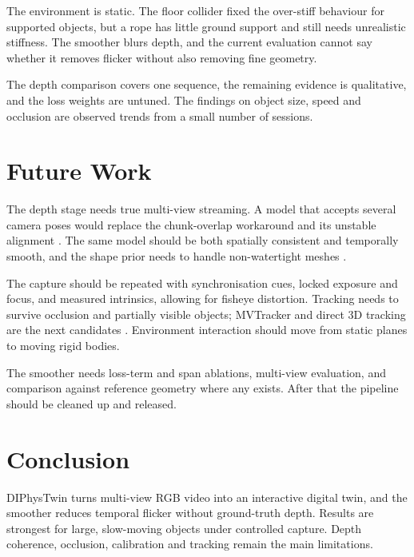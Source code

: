 The environment is static. The floor collider fixed the over-stiff behaviour for supported
objects, but a rope has little ground support and still needs unrealistic stiffness. The smoother
blurs depth, and the current evaluation cannot say whether it removes flicker without also removing
fine geometry. \label{sec:disc-environment}\label{sec:disc-smoothing}

The depth comparison covers one sequence, the remaining evidence is qualitative, and the loss
weights are untuned. The findings on object size, speed and occlusion are observed trends from a small number of sessions.
\label{sec:disc-validity}

\section{Future Work}
\label{sec:concl-future}

The depth stage needs true multi-view streaming. A model that accepts several camera poses would
replace the chunk-overlap workaround and its unstable alignment \parencite{umeyama1991}. The same
model should be both spatially consistent and temporally smooth, and the shape prior needs to handle
non-watertight meshes \parencite{arap}. \label{sec:concl-streaming}\label{sec:concl-depth}

The capture should be repeated with synchronisation cues, locked exposure and focus, and measured
intrinsics, allowing for fisheye distortion.
Tracking needs to survive occlusion and partially visible objects; MVTracker and direct 3D tracking
are the next candidates \parencite{mvtracker, spatrackerv2}. Environment interaction
should move from static planes to moving rigid bodies. \label{sec:concl-data}\label{sec:concl-tracking}\label{sec:concl-environment}

The smoother needs loss-term and span ablations, multi-view evaluation, and comparison against
reference geometry where any exists. After that the pipeline should be cleaned up and released.
\label{sec:concl-code}

\section{Conclusion}
\label{sec:concl-closing}

DIPhysTwin turns multi-view RGB video into an interactive digital twin, and the smoother reduces
temporal flicker without ground-truth depth. Results are strongest for large, slow-moving
objects under controlled capture. Depth coherence, occlusion, calibration and tracking remain the
main limitations.
